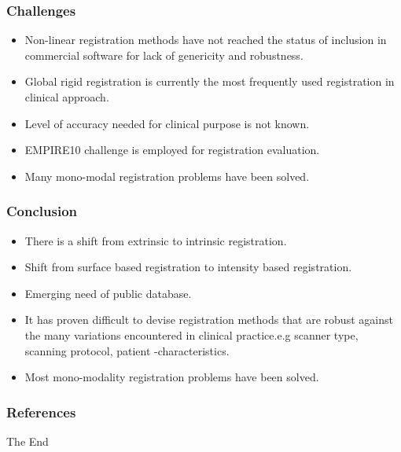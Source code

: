 \documentclass{beamer}
\begin{document}
\begin{frame}
\frametitle{Challenges}

\begin{itemize}


\item Non-linear registration methods have not reached the status of inclusion in commercial software for lack of genericity and robustness.
\item Global rigid registration is currently the most frequently used registration in clinical approach.
\item Level of accuracy needed for clinical purpose is not known.
\item EMPIRE10 challenge is employed for registration evaluation.
\item Many mono-modal registration problems have been solved.
\end{itemize}





\end{frame}


\begin{frame}
\frametitle{Conclusion}
\begin{itemize}

\item There is a shift from extrinsic to intrinsic registration.
\item Shift from surface based registration to intensity based registration.
\item Emerging need of public database.
\item It has proven difficult to devise registration methods that are robust against the many variations encountered in clinical practice.e.g scanner type, scanning protocol, patient -characteristics.
\item Most mono-modality registration problems have been solved.


\end{itemize}
\end{frame}





\begin{frame}
\frametitle{References}


\end{frame}


\begin{frame}
\Huge{\centerline{The End}}
\end{frame}

\end{document}
